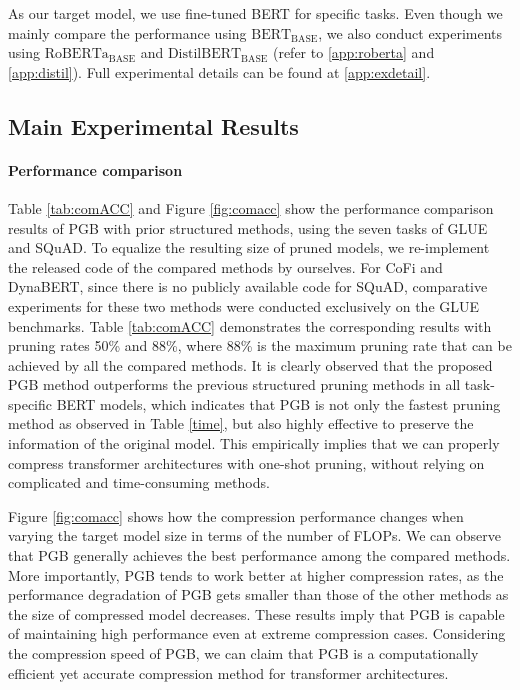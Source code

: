 As our target model, we use fine-tuned BERT \cite{BERT} for specific tasks. Even though we mainly compare the performance using $\text{BERT}_{\text{BASE}}$, we also conduct experiments using $\text{RoBERTa}_{\text{BASE}}$ and $\text{DistilBERT}_{\text{BASE}}$ \cite{DistilB} (refer to \ref{app:roberta} and \ref{app:distil}). Full experimental details can be found at \ref{app:exdetail}.

\subsection{Main Experimental Results}

\paragraph{Performance comparison}
Table \ref{tab:comACC} and Figure \ref{fig:comacc} show the performance comparison results of PGB with prior structured methods, using the seven tasks of GLUE and SQuAD. To equalize the resulting size of pruned models, we re-implement the released code of the compared methods by ourselves. For CoFi and DynaBERT, since there is no publicly available code for SQuAD, comparative experiments for these two methods were conducted exclusively on the GLUE benchmarks. Table \ref{tab:comACC} demonstrates the corresponding results with pruning rates 50\% and 88\%, where 88\% is the maximum pruning rate that can be achieved by all the compared methods. It is clearly observed that the proposed PGB method outperforms the previous structured pruning methods in all task-specific BERT models, which indicates that PGB is not only the fastest pruning method as observed in Table \ref{time}, but also highly effective to preserve the information of the original model. This empirically implies that we can properly compress transformer architectures with one-shot pruning, without relying on complicated and time-consuming methods.


Figure \ref{fig:comacc} shows how the compression performance changes when varying the target model size in terms of the number of FLOPs. We can observe that PGB generally achieves the best performance among the compared methods. More importantly, PGB tends to work better at higher compression rates, as the performance degradation of PGB gets smaller than those of the other methods as the size of compressed model decreases. These results imply that PGB is capable of maintaining high performance even at extreme compression cases. Considering the compression speed of PGB, we can claim that PGB is a computationally efficient yet accurate compression method for transformer architectures. 

